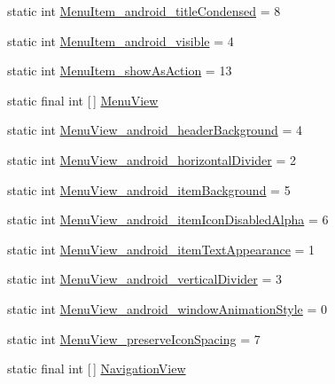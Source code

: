 \begin{DoxyCompactItemize}
\item 
static int \hyperlink{classandroid_1_1support_1_1v4_1_1R_1_1styleable_a45ff077834fcd2795e645a9cb5facc6c}{Menu\+Item\+\_\+android\+\_\+title\+Condensed} = 8
\item 
static int \hyperlink{classandroid_1_1support_1_1v4_1_1R_1_1styleable_a7ecbdc18eb559caa4b13337a04e90d37}{Menu\+Item\+\_\+android\+\_\+visible} = 4
\item 
static int \hyperlink{classandroid_1_1support_1_1v4_1_1R_1_1styleable_af0324d2b0e053a7dd60cd8d48f7915dc}{Menu\+Item\+\_\+show\+As\+Action} = 13
\item 
static final int \mbox{[}$\,$\mbox{]} \hyperlink{classandroid_1_1support_1_1v4_1_1R_1_1styleable_a6f981f3b295d914b69b142c57cdfcabf}{Menu\+View}
\item 
static int \hyperlink{classandroid_1_1support_1_1v4_1_1R_1_1styleable_a971cdc4ef5fe743adb7025a13b9f3da6}{Menu\+View\+\_\+android\+\_\+header\+Background} = 4
\item 
static int \hyperlink{classandroid_1_1support_1_1v4_1_1R_1_1styleable_a626e514babb4d9c7bbca39cdd99c10bf}{Menu\+View\+\_\+android\+\_\+horizontal\+Divider} = 2
\item 
static int \hyperlink{classandroid_1_1support_1_1v4_1_1R_1_1styleable_adda46f208eef1247d481e4c8ecc3c039}{Menu\+View\+\_\+android\+\_\+item\+Background} = 5
\item 
static int \hyperlink{classandroid_1_1support_1_1v4_1_1R_1_1styleable_aa9bab0281cd32b9892b27ae9cf5ee6e6}{Menu\+View\+\_\+android\+\_\+item\+Icon\+Disabled\+Alpha} = 6
\item 
static int \hyperlink{classandroid_1_1support_1_1v4_1_1R_1_1styleable_a421fdc72dee45bf4d8a3528c310da6f7}{Menu\+View\+\_\+android\+\_\+item\+Text\+Appearance} = 1
\item 
static int \hyperlink{classandroid_1_1support_1_1v4_1_1R_1_1styleable_af14763212ce7ca49cc48e32a6a0f5cd2}{Menu\+View\+\_\+android\+\_\+vertical\+Divider} = 3
\item 
static int \hyperlink{classandroid_1_1support_1_1v4_1_1R_1_1styleable_a69e7a03d136e8951fa5421ee2396b18b}{Menu\+View\+\_\+android\+\_\+window\+Animation\+Style} = 0
\item 
static int \hyperlink{classandroid_1_1support_1_1v4_1_1R_1_1styleable_a7d9ee3b9e735dd16f51e9c76f6dc4fc5}{Menu\+View\+\_\+preserve\+Icon\+Spacing} = 7
\item 
static final int \mbox{[}$\,$\mbox{]} \hyperlink{classandroid_1_1support_1_1v4_1_1R_1_1styleable_a6e99b86cbaa0c61ca7598c15df537789}{Navigation\+View}

\end{DoxyCompactItemize}
